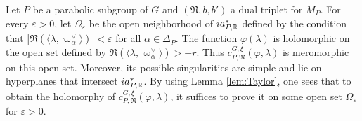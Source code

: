 \begin{paragr}
\begin{preuve}
Let $P$ be a parabolic subgroup of $G$ and $(\mathfrak{N},b,b')$ a dual triplet for $M_P$. For every $\varepsilon>0$, let $\Omega_\varepsilon$ be the open neighborhood of $ia_{P,\mathbb{R}}^*$ defined by the condition that $|\Re(\langle \lambda,\varpi_\alpha^\vee\rangle)|<\varepsilon$ for all $\alpha\in \Delta_P$. 
The function $\varphi(\lambda)$ is holomorphic on the open set defined by $\Re(\langle \lambda,\varpi_\alpha^\vee\rangle)>-r$. Thus $c_{P,\mathfrak{N}}^{G,\xi}(\varphi,\lambda)$ is meromorphic on this open set. Moreover, its possible singularities are simple and lie on hyperplanes that intersect $ia_{P,\mathbb{R}}^*$. By using Lemma \ref{lem:Taylor}, one sees that to obtain the holomorphy of $c_{P,\mathfrak{N}}^{G,\xi}(\varphi,\lambda)$, it suffices to prove it on some open set $\Omega_\varepsilon$ for $\varepsilon>0$.


\end{preuve}
\end{paragr}
